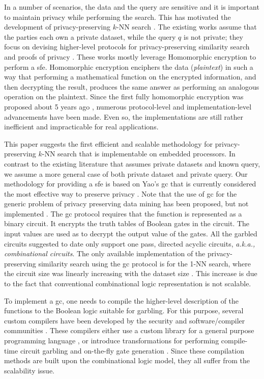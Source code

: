 In a number of scenarios, the data and the query are sensitive and it is important to maintain privacy while performing the search.
This has motivated the development of privacy-preserving $k$-NN search \cite{shaneck2009privacy}.
The existing works assume that the parties each own a private dataset, while the query $q$ is not private; they focus on devising higher-level protocols for privacy-preserving similarity search and proofs of privacy \cite{shaneck2009privacy,qi2008efficient}.
These works mostly leverage Homomorphic encryption to perform a \acrfull{sfe}.
Homomorphic encryption enciphers the data (\emph{plaintext}) in such a way that performing a mathematical function on the encrypted information, and then decrypting the result, produces the same answer as performing an analogous operation on the plaintext.
Since the first fully homomorphic encryption was proposed about 5 years ago \cite{gentry2009fully}, numerous protocol-level and implementation-level advancements have been made.
Even so, the implementations are still rather inefficient and impracticable for real applications.

This paper suggests the first efficient and scalable methodology for privacy-preserving $k$-NN search that is implementable on embedded processors.
In contrast to the existing literature that assumes private datasets and known query, we assume a more general case of both private dataset and private query.
Our methodology for providing a \acrshort{sfe} is based on Yao's \acrfull{gc} that is currently considered the most effective way to preserve privacy \cite{huang2012private,brenner2011hcrypt}.
Note that the use of \acrshort{gc} for the generic problem of privacy preserving data mining has been proposed, but not implemented \cite{agrawal2000privacy}.
The \acrshort{gc} protocol requires that the function is represented as a binary circuit.
It encrypts the truth tables of Boolean gates in the circuit.
The input values are used as to decrypt the output value of the gates.
All the garbled circuits suggested to date only support one pass, directed acyclic circuits, \emph{a.k.a., combinational circuits}.
The only available implementation of the privacy-preserving similarity search using the \acrshort{gc} protocol is for the 1-NN search, where the circuit size was linearly increasing with the dataset size \cite{kolesnikov2009improved}.
This increase is due to the fact that conventional combinational logic representation is not scalable.

To implement a \acrshort{gc}, one needs to compile the higher-level description of the functions to the Boolean logic suitable for garbling.
For this purpose, several custom compilers have been developed by the security and software/compiler communities \cite{malkhi2004fairplay,henecka2010tasty,holzer2012secure,kreuter2013pcf}.
These compilers either use a custom library for a general purpose programming language \cite{malkhi2004fairplay}, or introduce transformations for performing compile-time circuit garbling and on-the-fly gate generation \cite{kreuter2013pcf}.
Since these compilation methods are built upon the combinational logic model, they all suffer from the scalability issue.

